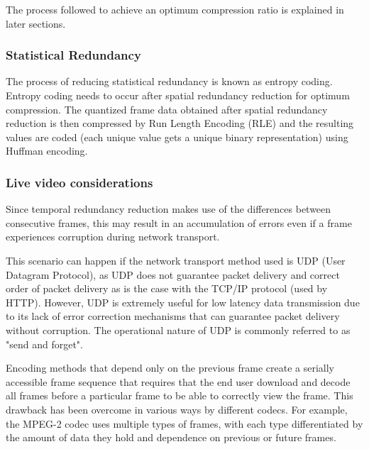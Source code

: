 \documentclass[letterpaper,12pt,titlepage,oneside,final]{report}
\begin{document}
                The process followed to achieve an optimum compression ratio is explained in later sections.

            \subsubsection{Statistical Redundancy}
                The process of reducing statistical redundancy is known as entropy coding. Entropy coding needs to occur after spatial redundancy reduction for optimum compression. The quantized frame data obtained after spatial redundancy reduction is then compressed by Run Length Encoding (RLE) and the resulting values are coded (each unique value gets a unique binary representation) using Huffman encoding. 

            \subsubsection{Live video considerations}
                Since temporal redundancy reduction makes use of the differences between consecutive frames, this may result in an accumulation of errors even if a frame experiences corruption during network transport. 

                This scenario can happen if the network transport method used is UDP (User Datagram Protocol), as UDP does not guarantee packet delivery and correct order of packet delivery as is the case with the TCP/IP protocol (used by HTTP). However, UDP is extremely useful for low latency data transmission due to its lack of error correction mechanisms that can guarantee packet delivery without corruption. The operational nature of UDP is commonly referred to as "send and forget".

                Encoding methods that depend only on the previous frame create a serially accessible frame sequence that requires that the end user download and decode all frames before a particular frame to be able to correctly view the frame. This drawback has been overcome in various ways by different codecs. For example, the MPEG-2 codec uses multiple types of frames, with each type differentiated by the amount of data they hold and dependence on previous or future frames.
\end{document}
